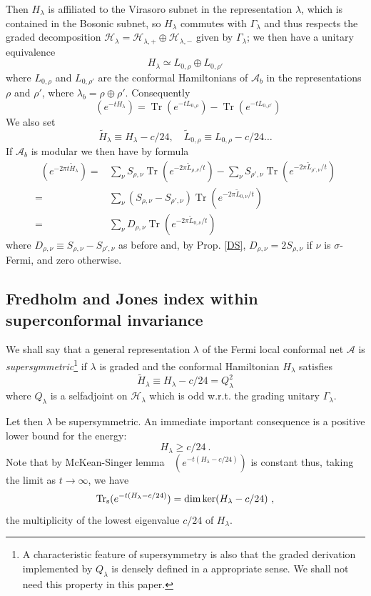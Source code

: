 \documentclass[11pt]{article}
\DeclareMathOperator{\Tr}{Tr}
\DeclareMathOperator{\Str}{Tr_{s}}
\def\dim{{\hbox{dim}}}
\def\Ga{\Gamma}
\def\l{\lambda}
\def\r{\rho}
\def\A{{\cal A}}
\def\H{{\cal H}}
\def\s{{\sigma}}
\def\A{{\mathcal A}}
\def\H{{\mathcal H}}
\begin{document}
Then $H_{\l}$ is affiliated to the Virasoro subnet in the representation $\l$, which is 
contained in the Bosonic subnet, so $H_{\l}$
commutes with $\Ga_{\l}$ and thus respects the graded decomposition 
$\H_\l = \H_{\l,+}\oplus\H_{\l,-}$ given by $\Ga_\l$; we then have a unitary equivalence
\[
H_{\l} \simeq L_{0,\r}\oplus L_{0,\r'}
\]
where $L_{0,\r}$ and $L_{0,\r'}$ are the conformal Hamiltonians of $\A_b$ 
in the  representations $\r$ and $\r'$, where $\l_b = \r\oplus\r'$. 
Consequently
\begin{equation}\label{strp}
\Str(e^{-tH_{\l}}) = \Tr(e^{-tL_{0,\r}}) - \Tr(e^{-tL_{0,\r'}})
\end{equation}
We also set
\[
\tilde H_{\l}\equiv H_{\l} - c/24,\quad\tilde L_{0,\r} \equiv 
L_{0,\r} - c/24\dots
\]
If $\A_b$ is modular we then have by formula
\begin{align}\label{m1}
\Str(e^{-2\pi t{\tilde H_{\l}}}) =&\sum_\nu
S_{\r,\nu}\Tr(e^{-2\pi\tilde L_{\r,\nu}/t}) -\sum_\nu 
S_{\r',\nu}\Tr(e^{-2\pi\tilde L_{\r',\nu}/t})\\
=& \sum_\nu
(S_{\r,\nu} - S_{\r',\nu})\Tr(e^{-2\pi\tilde L_{0,\nu}/t})\\
=& \sum_\nu
D_{\r,\nu}\Tr(e^{-2\pi\tilde L_{0,\nu}/t})
\end{align}
where $D_{\r,\nu}\equiv S_{\r,\nu} - S_{\r',\nu}$ as before and, by Prop. \ref{DS},  $D_{\r,\nu}= 2S_{\r,\nu}$ if $\nu$ is $\s$-Fermi, and zero otherwise.

\subsection{Fredholm and Jones index within superconformal invariance}
%
We shall say that a general representation $\l$ of the Fermi local conformal net $\A$ is 
\emph{supersymmetric}\footnote{A characteristic feature of supersymmetry is also that the graded derivation implemented by $Q_\l$ is densely defined in a appropriate sense. We shall not need this property in this paper.}
if $\l$ is graded and the conformal Hamiltonian $H_{\l}$ satisfies
\[
\tilde H_{\l} \equiv H_{\l} - c/24 = Q_{\l}^2
\]
where $Q_{\l}$ is a selfadjoint on $\H_{\l}$ which is odd w.r.t. the grading unitary $\Ga_{\l}$. 

Let then $\l$ be supersymmetric. An immediate important consequence is a positive lower bound for the energy:
\[
H_{\l}\geq c/24\ .
\]
Note that by McKean-Singer lemma $\Str(e^{-t(H_{\l} - c/24)})$ is constant thus, taking the limit as $t\to\infty$, we have
\begin{equation}\label{Windex}
\Str(e^{-t(H_{\l} - c/24)}) = \dim\ker(H_{\l} - c/24)\ ,
\end{equation}
the multiplicity of the lowest eigenvalue $c/24$ of $H_{\l}$.
\end{document}
